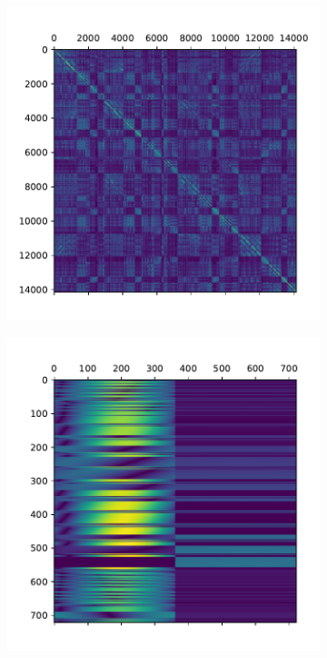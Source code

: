 \begin{figure}[H]
    \begin{subfigure}{.5\textwidth}
        \centering
        \includegraphics[width=1.0\linewidth]{images/mat.pdf}
        \caption{}
        \label{fig:matrix}
    \end{subfigure}
    \begin{subfigure}{.5\textwidth}
        \centering
        \includegraphics[width=1.0\linewidth]{images/rhs.pdf}
        \caption{}
        \label{fig:rhs}
    \end{subfigure}
\end{figure} 
